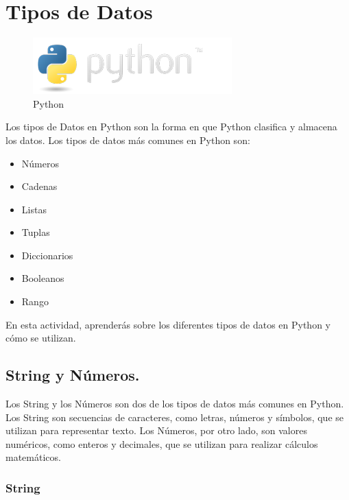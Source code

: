 \documentclass[
  a4paper,
  DIV=11,
  numbers=noendperiod,
  onepage,
  openany]{scrreprt}
\providecommand{\tightlist}{%
  \setlength{\itemsep}{0pt}\setlength{\parskip}{0pt}}\usepackage{longtable,booktabs,array}
\begin{document}
\chapter{Tipos de Datos}\label{tipos-de-datos}

\begin{figure}[H]

{\centering \includegraphics{index_files/mediabag/python-logo.png}

}

\caption{Python}

\end{figure}%

Los tipos de Datos en Python son la forma en que Python clasifica y
almacena los datos. Los tipos de datos más comunes en Python son:

\begin{itemize}
\tightlist
\item
  Números
\item
  Cadenas
\item
  Listas
\item
  Tuplas
\item
  Diccionarios
\item
  Booleanos
\item
  Rango
\end{itemize}

En esta actividad, aprenderás sobre los diferentes tipos de datos en
Python y cómo se utilizan.

\section{String y Números.}\label{string-y-nuxfameros.}

Los String y los Números son dos de los tipos de datos más comunes en
Python. Los String son secuencias de caracteres, como letras, números y
símbolos, que se utilizan para representar texto. Los Números, por otro
lado, son valores numéricos, como enteros y decimales, que se utilizan
para realizar cálculos matemáticos.

\subsection{String}\label{string}
\end{document}
